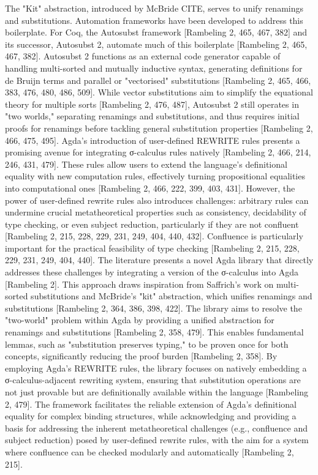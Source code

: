 \documentclass[screen,nonacm]{acmart}
\begin{document}
The "Kit" abstraction, introduced by McBride CITE, serves to unify renamings
and substitutions. Automation frameworks have been developed to address this
boilerplate. For Coq, the Autosubst framework [Rambeling 2, 465, 467, 382] and
its successor, Autosubst 2, automate much of this boilerplate [Rambeling 2,
            465, 467, 382]. Autosubst 2 functions as an external code generator capable of
handling multi-sorted and mutually inductive syntax, generating definitions for
de Bruijn terms and parallel or "vectorised" substitutions [Rambeling 2, 465,
            466, 383, 476, 480, 486, 509]. While vector substitutions aim to simplify the
equational theory for multiple sorts [Rambeling 2, 476, 487], Autosubst 2 still
operates in "two worlds," separating renamings and substitutions, and thus
requires initial proofs for renamings before tackling general substitution
properties [Rambeling 2, 466, 475, 495]. Agda's introduction of user-defined
REWRITE rules presents a promising avenue for integrating σ-calculus rules
natively [Rambeling 2, 466, 214, 246, 431, 479]. These rules allow users to
extend the language's definitional equality with new computation rules,
effectively turning propositional equalities into computational ones [Rambeling
            2, 466, 222, 399, 403, 431]. However, the power of user-defined rewrite rules
also introduces challenges: arbitrary rules can undermine crucial
metatheoretical properties such as consistency, decidability of type checking,
or even subject reduction, particularly if they are not confluent [Rambeling 2,
            215, 228, 229, 231, 249, 404, 440, 432]. Confluence is particularly important
for the practical feasibility of type checking [Rambeling 2, 215, 228, 229,
            231, 249, 404, 440]. The literature presents a novel Agda library that directly
addresses these challenges by integrating a version of the σ-calculus into Agda
      [Rambeling 2]. This approach draws inspiration from Saffrich's work on
multi-sorted substitutions and McBride's "kit" abstraction, which unifies
renamings and substitutions [Rambeling 2, 364, 386, 398, 422]. The library aims
to resolve the "two-world" problem within Agda by providing a unified
abstraction for renamings and substitutions [Rambeling 2, 358, 479]. This
enables fundamental lemmas, such as "substitution preserves typing," to be
proven once for both concepts, significantly reducing the proof burden
      [Rambeling 2, 358]. By employing Agda's REWRITE rules, the library focuses on
natively embedding a σ-calculus-adjacent rewriting system, ensuring that
substitution operations are not just provable but are definitionally available
within the language [Rambeling 2, 479]. The framework facilitates the reliable
extension of Agda's definitional equality for complex binding structures, while
acknowledging and providing a basis for addressing the inherent metatheoretical
challenges (e.g., confluence and subject reduction) posed by user-defined
rewrite rules, with the aim for a system where confluence can be checked
modularly and automatically [Rambeling 2, 215].
\end{document}
